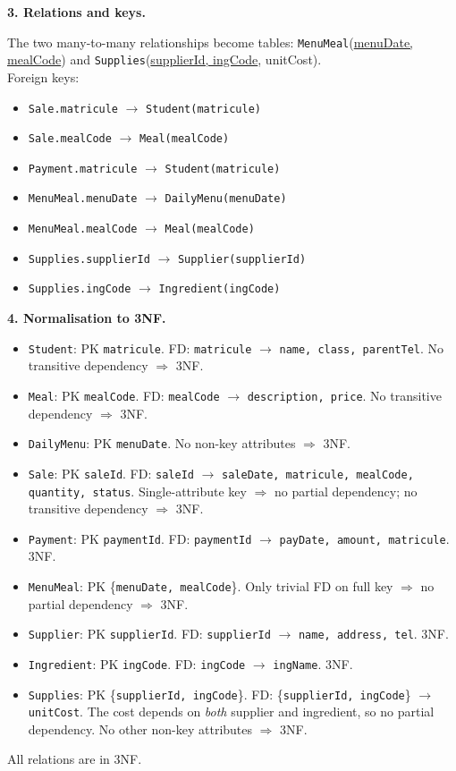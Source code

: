 \documentclass[11pt]{article}
\begin{document}
\textbf{3. Relations and keys.}\par
The two many-to-many relationships become tables:
\texttt{MenuMeal}(\underline{menuDate, mealCode}) and \texttt{Supplies}(\underline{supplierId, ingCode}, unitCost).\\
Foreign keys:
\begin{itemize}
\item \texttt{Sale.matricule} $\rightarrow$ \texttt{Student(matricule)}
\item \texttt{Sale.mealCode} $\rightarrow$ \texttt{Meal(mealCode)}
\item \texttt{Payment.matricule} $\rightarrow$ \texttt{Student(matricule)}
\item \texttt{MenuMeal.menuDate} $\rightarrow$ \texttt{DailyMenu(menuDate)}
\item \texttt{MenuMeal.mealCode} $\rightarrow$ \texttt{Meal(mealCode)}
\item \texttt{Supplies.supplierId} $\rightarrow$ \texttt{Supplier(supplierId)}
\item \texttt{Supplies.ingCode} $\rightarrow$ \texttt{Ingredient(ingCode)}
\end{itemize}

\textbf{4. Normalisation to 3NF.}\par
\begin{itemize}
\item \texttt{Student}: PK \texttt{matricule}. FD: \texttt{matricule} $\rightarrow$ \texttt{name, class, parentTel}. No transitive dependency $\Rightarrow$ 3NF.
\item \texttt{Meal}: PK \texttt{mealCode}. FD: \texttt{mealCode} $\rightarrow$ \texttt{description, price}. No transitive dependency $\Rightarrow$ 3NF.
\item \texttt{DailyMenu}: PK \texttt{menuDate}. No non-key attributes $\Rightarrow$ 3NF.
\item \texttt{Sale}: PK \texttt{saleId}. FD: \texttt{saleId} $\rightarrow$ \texttt{saleDate, matricule, mealCode, quantity, status}. Single-attribute key $\Rightarrow$ no partial dependency; no transitive dependency $\Rightarrow$ 3NF.
\item \texttt{Payment}: PK \texttt{paymentId}. FD: \texttt{paymentId} $\rightarrow$ \texttt{payDate, amount, matricule}. 3NF.
\item \texttt{MenuMeal}: PK \{\texttt{menuDate, mealCode}\}. Only trivial FD on full key $\Rightarrow$ no partial dependency $\Rightarrow$ 3NF.
\item \texttt{Supplier}: PK \texttt{supplierId}. FD: \texttt{supplierId} $\rightarrow$ \texttt{name, address, tel}. 3NF.
\item \texttt{Ingredient}: PK \texttt{ingCode}. FD: \texttt{ingCode} $\rightarrow$ \texttt{ingName}. 3NF.
\item \texttt{Supplies}: PK \{\texttt{supplierId, ingCode}\}. FD: \{\texttt{supplierId, ingCode}\} $\rightarrow$ \texttt{unitCost}. The cost depends on \emph{both} supplier and ingredient, so no partial dependency. No other non-key attributes $\Rightarrow$ 3NF.
\end{itemize}
All relations are in 3NF.
\end{document}
